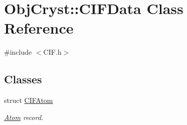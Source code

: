 \hypertarget{class_obj_cryst_1_1_c_i_f_data}{}\section{Obj\+Cryst\+::C\+I\+F\+Data Class Reference}
\label{class_obj_cryst_1_1_c_i_f_data}


{\ttfamily \#include $<$C\+I\+F.\+h$>$}

\subsection*{Classes}
\begin{DoxyCompactItemize}
\item 
struct \mbox{\hyperlink{struct_obj_cryst_1_1_c_i_f_data_1_1_c_i_f_atom}{C\+I\+F\+Atom}}
\begin{DoxyCompactList}\small\item\em \mbox{\hyperlink{class_obj_cryst_1_1_atom}{Atom}} record. \end{DoxyCompactList}\end{DoxyCompactItemize}
